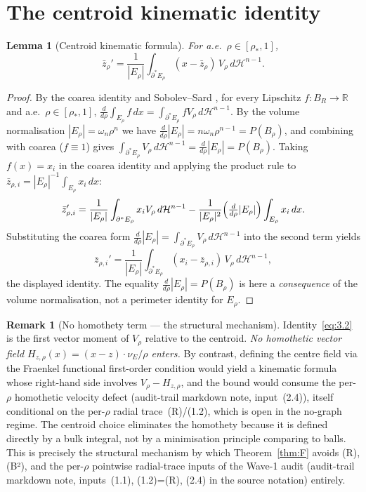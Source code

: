 \documentclass[11pt]{article}
\newtheorem{lemma}[theorem]{Lemma}
\theoremstyle{definition}
\newtheorem{remark}[theorem]{Remark}
\newcommand{\R}{\mathbb{R}}
\newcommand{\rstar}{\rho_{*}}
\newcommand{\zbar}{\bar z_{\rho}}
\begin{document}
\section{The centroid kinematic identity}\label{sec:kinematic}

\begin{lemma}[Centroid kinematic formula]\label{lem:3.1}
For a.e.\ $\rho\in[\rstar,1]$,
\begin{equation}\label{eq:3.2}
   \bar z_\rho'
   =\frac{1}{|E_\rho|}\int_{\partial^*E_\rho}(x-\zbar)\,V_\rho\,d\mathcal H^{n-1}.
\end{equation}
\end{lemma}

\begin{proof}
By the coarea identity \cite[\S3]{LevelSetIdentity} and Sobolev--Sard
\cite[App.~A, Thm.~A.1]{FigalliMaggi2011}, for every Lipschitz $f:B_R\to\R$ and
a.e.\ $\rho\in[\rstar,1]$,
$\frac{d}{d\rho}\int_{E_\rho}f\,dx=\int_{\partial^*E_\rho}f V_\rho\,d\mathcal H^{n-1}$.
By the volume normalisation $|E_\rho|=\omega_n\rho^n$ we have
$\tfrac{d}{d\rho}|E_\rho|=n\omega_n\rho^{n-1}=P(B_\rho)$, and combining
with coarea ($f\equiv 1$) gives
$\int_{\partial^*E_\rho}V_\rho\,d\mathcal H^{n-1}=\tfrac{d}{d\rho}|E_\rho|=P(B_\rho)$.
Taking $f(x)=x_i$ in the coarea identity and applying the product
rule to $\bar z_{\rho,i}=|E_\rho|^{-1}\int_{E_\rho}x_i\,dx$:
\[
   \bar z_{\rho,i}'
   =\frac{1}{|E_\rho|}\int_{\partial^*E_\rho}x_i V_\rho\,d\mathcal H^{n-1}
   -\frac{1}{|E_\rho|^2}\Bigl(\tfrac{d}{d\rho}|E_\rho|\Bigr)
       \int_{E_\rho}x_i\,dx.
\]
Substituting the coarea form
$\tfrac{d}{d\rho}|E_\rho|=\int_{\partial^*E_\rho}V_\rho\,d\mathcal H^{n-1}$
into the second term yields
\[
   \bar z_{\rho,i}'
   =\frac{1}{|E_\rho|}\int_{\partial^*E_\rho}(x_i-\bar z_{\rho,i})\,V_\rho\,d\mathcal H^{n-1},
\]
the displayed identity. The equality
$\tfrac{d}{d\rho}|E_\rho|=P(B_\rho)$ is here a \emph{consequence} of
the volume normalisation, not a perimeter identity for $E_\rho$.
\end{proof}

\begin{remark}[No homothety term --- the structural mechanism]
\label{rmk:no-homothety}
Identity~\eqref{eq:3.2} is the first vector moment of $V_\rho$ relative
to the centroid. \emph{No homothetic vector field
$H_{z,\rho}(x)=(x-z)\cdot\nu_E/\rho$ enters.} By contrast, defining
the centre field via the Fraenkel functional first-order condition
would yield a kinematic formula whose right-hand side involves
$V_\rho-H_{z,\rho}$, and the bound would consume the per-$\rho$
homothetic velocity defect (audit-trail markdown note, input~(2.4)),
itself conditional on the per-$\rho$ radial trace~(R)/(1.2), which is
open in the no-graph regime. The centroid choice eliminates the
homothety because it is defined directly by a bulk integral, not by a
minimisation principle comparing to balls. This is precisely the
structural mechanism by which Theorem~\ref{thm:F} avoids (R), (B²),
and the per-$\rho$ pointwise radial-trace inputs of the Wave-1 audit
(audit-trail markdown note, inputs~(1.1), (1.2)=(R), (2.4) in the
source notation) entirely.
\end{remark}
\end{document}
